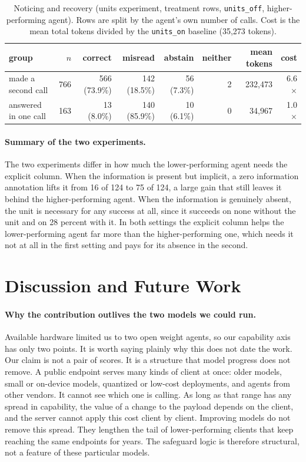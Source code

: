 \documentclass[sigconf]{ceurart}
\begin{document}
\begin{table}[t]
\centering
\small
\caption{Noticing and recovery (units experiment, treatment rows, \texttt{units\_off},
higher-performing agent). Rows are split by the agent's own number of calls. Cost
is the mean total tokens divided by the \texttt{units\_on} baseline (35{,}273
tokens).}
\label{tab:mediation}
\begin{tabular}{lrrrrrrr}
\toprule
group & $n$ & correct & misread & abstain & neither & mean tokens & cost \\
\midrule
made a second call & 766 & 566 (73.9\%) & 142 (18.5\%) & 56 (7.3\%) & 2 & 232{,}473 & 6.6$\times$ \\
answered in one call & 163 & 13 (8.0\%) & 140 (85.9\%) & 10 (6.1\%) & 0 & 34{,}967 & 1.0$\times$ \\
\bottomrule
\end{tabular}
\end{table}

\paragraph{Summary of the two experiments.}
The two experiments differ in how much the lower-performing agent needs the explicit
column. When the information is present but implicit, a zero information annotation
lifts it from 16 of 124 to 75 of 124, a large gain that still leaves it behind the
higher-performing agent. When the information is genuinely absent, the unit is
necessary for any success at all, since it succeeds on none without the unit and on
28 percent with it. In both settings the explicit column helps the lower-performing
agent far more than the higher-performing one, which needs it not at all in the
first setting and pays for its absence in the second.

\section{Discussion and Future Work}

\paragraph{Why the contribution outlives the two models we could run.}
Available hardware limited us to two open weight agents, so our capability axis has
only two points. It is worth saying plainly why this does not date the work. Our
claim is not a pair of scores. It is a structure that model progress does not
remove. A public endpoint serves many kinds of client at once: older models, small
or on-device models, quantized or low-cost deployments, and agents from other
vendors. It cannot see which one is calling. As long as that
range has any spread in capability, the value of a change to the payload depends on
the client, and the server cannot apply this cost client by client. Improving models
do not remove this spread. They lengthen the tail of lower-performing
clients that keep reaching the same endpoints for years. The safeguard logic is
therefore structural, not a feature of these particular models.
\end{document}
